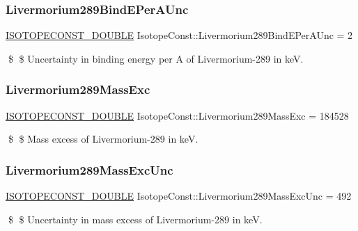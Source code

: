 \subsubsection{\texorpdfstring{Livermorium289\+Bind\+E\+Per\+A\+Unc}{Livermorium289BindEPerAUnc}}
{\footnotesize\ttfamily \mbox{\hyperlink{group___isotope_const-_macros_ga8f45a7272ce02c0b4c65c44636ed719a}{I\+S\+O\+T\+O\+P\+E\+C\+O\+N\+S\+T\+\_\+\+D\+O\+U\+B\+LE}} Isotope\+Const\+::\+Livermorium289\+Bind\+E\+Per\+A\+Unc = 2}

\$ \$ Uncertainty in binding energy per A of Livermorium-\/289 in keV. \mbox{\label{group___isotope_const-_livermorium-_lv289_ga8be64d572a2d2c87bcd8da6c6b25b5f6}} 
\subsubsection{\texorpdfstring{Livermorium289\+Mass\+Exc}{Livermorium289MassExc}}
{\footnotesize\ttfamily \mbox{\hyperlink{group___isotope_const-_macros_ga8f45a7272ce02c0b4c65c44636ed719a}{I\+S\+O\+T\+O\+P\+E\+C\+O\+N\+S\+T\+\_\+\+D\+O\+U\+B\+LE}} Isotope\+Const\+::\+Livermorium289\+Mass\+Exc = 184528}

\$ \$ Mass excess of Livermorium-\/289 in keV. \mbox{\label{group___isotope_const-_livermorium-_lv289_gad00bb3564a81bbefd8572ef826f8c83d}} 
\subsubsection{\texorpdfstring{Livermorium289\+Mass\+Exc\+Unc}{Livermorium289MassExcUnc}}
{\footnotesize\ttfamily \mbox{\hyperlink{group___isotope_const-_macros_ga8f45a7272ce02c0b4c65c44636ed719a}{I\+S\+O\+T\+O\+P\+E\+C\+O\+N\+S\+T\+\_\+\+D\+O\+U\+B\+LE}} Isotope\+Const\+::\+Livermorium289\+Mass\+Exc\+Unc = 492}

\$ \$ Uncertainty in mass excess of Livermorium-\/289 in keV. \mbox{\label{group___isotope_const-_livermorium-_lv289_ga69a5c6e10b51d7e708054447a1142b76}} 

